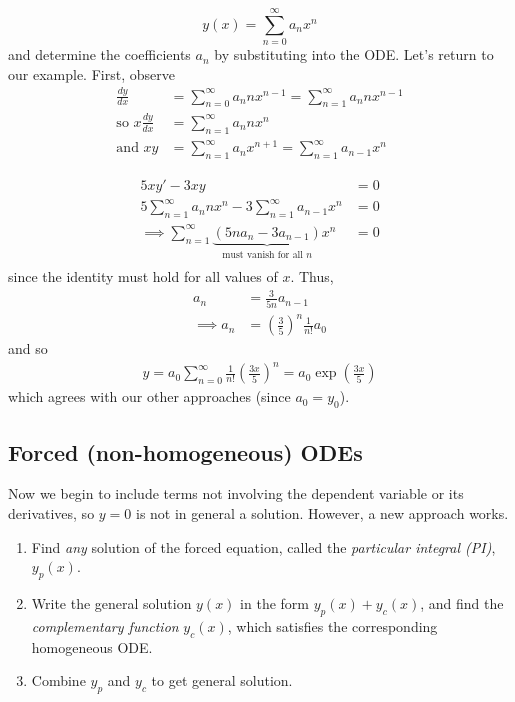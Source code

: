\documentclass{../../template/note}
\begin{document}
    \[
        y(x) = \sum_{n=0}^\infty a_nx^n
    \]
    and determine the coefficients \(a_n\) by substituting into the ODE. Let's return to our example. First, observe
    \begin{align*}
        \frac{dy}{dx} &= \sum_{n=0}^\infty a_n n x^{n-1} = \sum_{n=1}^\infty a_n n x^{n-1} \\
        \text{so } x \frac{dy}{dx} &= \sum_{n=1}^\infty a_n n x^n \\
        \text{and } xy &= \sum_{n=1}^\infty a_n x^{n+1} = \sum_{n=1}^\infty a_{n-1}x^n
    \end{align*}
    

    \begin{example}
        \begin{align*}
            5xy'-3xy&=0 \\
            5\sum_{n=1}^\infty a_nnx^n - 3\sum_{n=1}^\infty a_{n-1}x^n &= 0 \\
            \implies \sum_{n=1}^\infty \underbrace{(5na_n - 3a_{n-1})}_{\text{must vanish for all }n}x^n &= 0 \\
        \end{align*}
        since the identity must hold for all values of \(x\). Thus,
        \begin{align*}
            a_n &= \frac{3}{5n}a_{n-1} \\
            \implies a_n &= \left(\frac 3 5 \right)^n \frac{1}{n!} a_0
        \end{align*}
        and so
        \begin{align*}
            y = a_0 \sum_{n=0}^\infty \frac{1}{n!} \left(\frac{3x}{5}\right)^n = a_0 \exp\left(\frac{3x}{5}\right)
        \end{align*}
        which agrees with our other approaches (since \(a_0 = y_0\)).
    \end{example}
    
    \subsection{Forced (non-homogeneous) ODEs}

    Now we begin to include terms not involving the dependent variable or its derivatives, so \(y=0\) is not in general a solution. However, a new approach works.

    \begin{enumerate}[label=\protect\circled{\arabic*}]
        \item Find \emph{any} solution of the forced equation, called the \emph{particular integral (PI)}, \(y_p(x)\).
        \item Write the general solution \(y(x)\) in the form \(y_p(x) + y_c(x)\), and find the \emph{complementary function} \(y_c(x)\), which satisfies the corresponding homogeneous ODE.
        \item Combine \(y_p\) and \(y_c\) to get general solution. 
    \end{enumerate}
    
\end{document}
